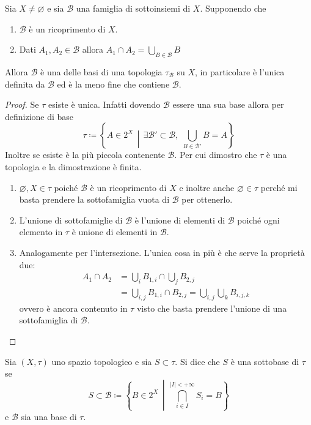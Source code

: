 \begin{theorem}
	\label{thr:set_simil_base_generate_top}
	Sia $X \neq \varnothing$ e sia $\mathcal{B}$ una famiglia di sottoinsiemi di $X$. Supponendo che 
	\begin{enumerate}
		\item $\mathcal{B}$ è un ricoprimento di $X$.
		\item Dati $A_1, A_2 \in \mathcal{B}$ allora $A_1 \cap A_2 = \bigcup_{B \in \mathcal{B}} B$  
	\end{enumerate}
	Allora $\mathcal{B}$ è una delle basi di una topologia $\tau_\mathcal{B}$ su $X$, in particolare è l'unica definita da $\mathcal{B}$ ed è la meno fine che contiene $\mathcal{B}$.
\end{theorem}
\begin{proof}
	Se $\tau$ esiste è unica. Infatti dovendo $\mathcal{B}$ essere una sua base allora per definizione di base 
	\begin{equation*}	
		\tau \coloneqq \left\{A \in 2^X \,\middle|\, \exists \mathcal{B}' \subset \mathcal{B} , \; \bigcup_{B \in \mathcal{B}'} B = A \right\}
	\end{equation*}
	Inoltre se esiste è la più piccola contenente $\mathcal{B}$.
	Per cui dimostro che $\tau$ è una topologia e la dimostrazione è finita.
	\begin{enumerate}
		\item $\varnothing, X \in \tau$ poiché $\mathcal{B}$ è un ricoprimento di $X$ e inoltre anche $\varnothing \in \tau$ perché mi basta prendere la sottofamiglia vuota di $\mathcal{B}$ per ottenerlo.
		\item L'unione di sottofamiglie di $\mathcal{B}$ è l'unione di elementi di $\mathcal{B}$ poiché ogni elemento in $\tau$ è unione di elementi in $\mathcal{B}$.
		\item Analogamente per l'intersezione. L'unica cosa in più è che serve la proprietà due:
		\begin{align*}
			A_1 \cap A_2 & = \bigcup_{i} B_{1,i} \cap \bigcup_{j} B_{2,j} \\
				& = \bigcup_{i,j} B_{1,i} \cap B_{2,j} = \bigcup_{i,j} \bigcup_{k} B_{i,j,k}
		\end{align*}
		ovvero è ancora contenuto in $\tau$ visto che basta prendere l'unione di una sottofamiglia di $\mathcal{B}$.
	\end{enumerate}
\end{proof}


\begin{definition}
	Sia $(X,\tau)$ uno spazio topologico e sia $S \subset \tau$. Si dice che $S$ è una sottobase di $\tau$ se 
	\begin{equation*}
		S \subset \mathcal{B} \coloneqq \left\{ B \in 2^X \,\middle|\, \bigcap^{|I| < +\infty}_{i \in I} S_i = B \right\}
	\end{equation*}
	e $\mathcal{B}$ sia una base di $\tau$.
\end{definition}

